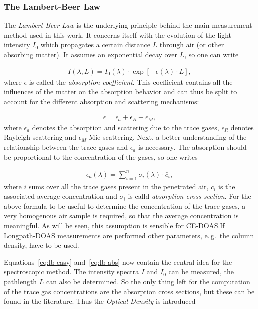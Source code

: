 \subsubsection{The Lambert-Beer Law}
\label{sec:lambert-beer}

The \emph{Lambert-Beer Law} is the underlying principle behind the
main measurement method used in this work. It concerns itself with the
evolution of the light intensity $I_0$ which propagates a certain
distance $L$ through air (or other absorbing matter). It assumes an
exponential decay over $L$, so one can write

\begin{align}
  I(\lambda, L) = I_0(\lambda) \cdot \exp[-\epsilon(\lambda) \cdot
  L], \label{eq:lb-easy}
\end{align}
where $\epsilon$ is called the \emph{absorption coefficient}. This
coefficient contains all the influences of the matter on the
absorption behavior and can thus be split to account for the different
absorption and scattering mechanisms:

\begin{align*}
  \epsilon = \epsilon_a + \epsilon_R + \epsilon_M,
\end{align*}
where $\epsilon_a$ denotes the absorption and scattering due to the
trace gases, $\epsilon_R$ denotes Rayleigh scattering and $\epsilon_M$
Mie scattering. Next, a better understanding of the relationship
between the trace gases and $\epsilon_a$ is necessary. The absorption
should be proportional to the concentration of the gases, so one
writes

\begin{align}
  \epsilon_a(\lambda) = \sum_{i=1}^n \sigma_i(\lambda) \cdot \bar c_i, \label{eq:lb-abs}
\end{align}
where $i$ sums over all the trace gases present in the penetrated air,
$\bar c_i$ is the associated average concentration and $\sigma_i$ is
calld \emph{absorption cross section}. For the above formula to be
useful to determine the concentration of the trace gases, a very
homogenous air sample is required, so that the average concentration
is meaningful. As will be seen, this assumption is sensible for
CE-DOAS.\@{}If Longpath-DOAS measurements are performed other
parameters, e.\,g.\ the column density, have to be used.

Equations~\eqref{eq:lb-easy} and~\eqref{eq:lb-abs} now contain the
central idea for the spectroscopic method. The intensity spectra $I$
and $I_0$ can be measured, the pathlength $L$ can also be
determined. So the only thing left for the computation of the trace
gas concentrations are the absorption cross sections, but these can be
found in the literature. Thus the \emph{Optical Density} is
introduced

